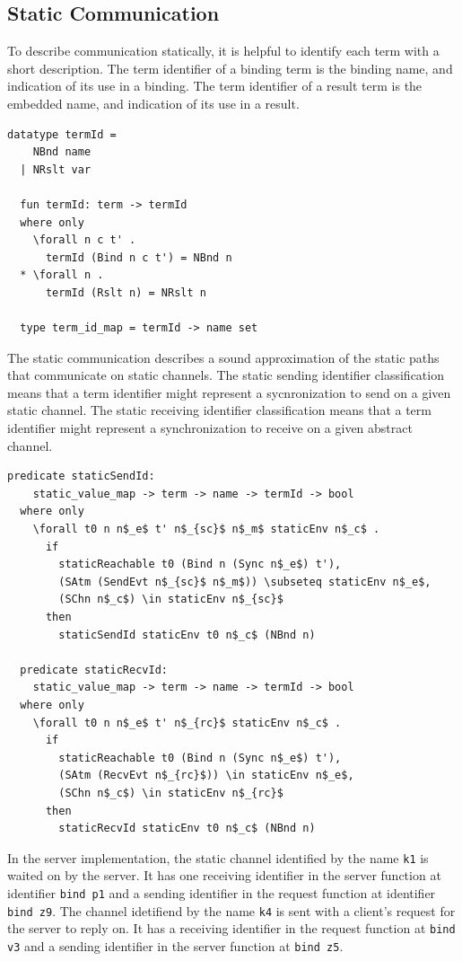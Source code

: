 \documentclass[letterpaper, 11pt]{extarticle}
\begin{document}
\subsection{Static Communication}
To describe communication statically, it is helpful to identify each term with a short description.
The term identifier of a binding term is the binding name, and indication of its use in a binding.
The term identifier of a result term is the embedded name, and indication of its use in a result.

\begin{lstlisting}[language=logic, mathescape]
  datatype termId =
    NBnd name
  | NRslt var

  fun termId: term -> termId
  where only
    \forall n c t' . 
      termId (Bind n c t') = NBnd n
  * \forall n . 
      termId (Rslt n) = NRslt n

  type term_id_map = termId -> name set
\end{lstlisting}

The static communication describes a sound approximation of
the static paths that communicate on static channels.
The static sending identifier classification means that a term identifier might represent a
sycnronization to send on a given static channel.
The static receiving identifier classification means that a term identifier might represent a
synchronization to receive on a given abstract channel. 

\begin{lstlisting}[language=logic, mathescape]
  predicate staticSendId:
    static_value_map -> term -> name -> termId -> bool
  where only
    \forall t0 n n$_e$ t' n$_{sc}$ n$_m$ staticEnv n$_c$ .
      if
        staticReachable t0 (Bind n (Sync n$_e$) t'),
        (SAtm (SendEvt n$_{sc}$ n$_m$)) \subseteq staticEnv n$_e$, 
        (SChn n$_c$) \in staticEnv n$_{sc}$
      then
        staticSendId staticEnv t0 n$_c$ (NBnd n)

  predicate staticRecvId:
    static_value_map -> term -> name -> termId -> bool
  where only
    \forall t0 n n$_e$ t' n$_{rc}$ staticEnv n$_c$ .
      if
        staticReachable t0 (Bind n (Sync n$_e$) t'),
        (SAtm (RecvEvt n$_{rc}$)) \in staticEnv n$_e$, 
        (SChn n$_c$) \in staticEnv n$_{rc}$ 
      then
        staticRecvId staticEnv t0 n$_c$ (NBnd n)
\end{lstlisting}


In the server implementation,
the static channel identified by the name \lstinline{k1} is waited on
by the server.  It has one receiving identifier in the server function
at identifier \lstinline[language=sugar_lang]{bind p1} and a sending identifier 
in the request function at identifier \lstinline[language=sugar_lang]{bind z9}.
The channel idetifiend by the name \lstinline{k4} is sent with a client's request for
the server to reply on. It has a receiving identifier in the request function at
\lstinline[language=sugar_lang]{bind v3} and a sending identifier in the server function at
\lstinline[language=sugar_lang]{bind z5}.
\end{document}
